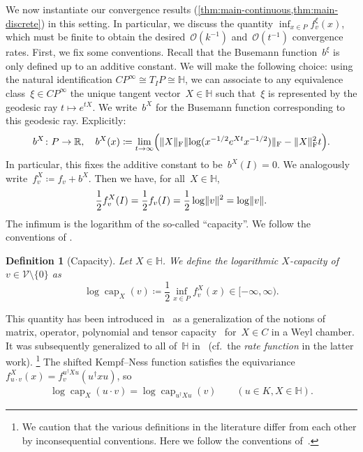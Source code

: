 \documentclass[11pt,letterpaper]{article}
\newtheorem{definition}[theorem]{Definition}\AddToHook{env/definition/begin}{\crefalias{theorem}{definition}}
\numberwithin{equation}{section}
\newcommand{\RR}{\mathbb{R}}
\newcommand{\bbH}{\mathbb{H}}
\newcommand{\VV}{\mathcal{V}}
\DeclareMathOperator{\capacity}{cap}
\DeclarePairedDelimiter\norm{\lVert}{\rVert}
\DeclarePairedDelimiter\parens{\lparen}{\rparen}
\begin{document}
We now instantiate our convergence results (\cref{thm:main-continuous,thm:main-discrete}) in this setting.
In particular, we discuss the quantity $\inf_{x \in P}f_v^\xi(x)$, which must be finite to obtain the desired~$\mathcal{O}(k^{-1})$ and~$\mathcal{O}(t^{-1})$ convergence rates.
First, we fix some conventions.
Recall that the Busemann function~$b^\xi$ is only defined up to an additive constant.
We will make the following choice: using the natural identification $CP^\infty \cong T_I P \cong \bbH$, we can associate to any equivalence class~$\xi\in CP^\infty$ the unique tangent vector~$X\in\bbH$ such that~$\xi$ is represented by the geodesic ray $t \mapsto e^{tX}$.
We write~$b^X$ for the Busemann function corresponding to this geodesic ray.
Explicitly:
\begin{align*}
    b^X \colon P \to \RR, \quad
    b^X(x) \coloneqq \lim_{t\to\infty} \parens*{ \norm{X}_{\mathrm F} \norm{\log(x^{-1/2}e^{Xt}x^{-1/2})}_{\mathrm F} - \norm{X}_{\mathrm F}^2 t }.
\end{align*}
In particular, this fixes the additive constant to be~$b^X(I)=0$.
We analogously write~$f_v^X \coloneqq f_v + b^X$.
Then we have, for all~$X \in \bbH$,
\[
  \frac12 f_v^X(I) = \frac12 f_v(I) = \frac12 \log \norm{v}^2 = \log \norm v.
\]
The infimum is the logarithm of the so-called ``capacity''.
We follow the conventions of \cite{FW2020}.

\begin{definition}[Capacity]
Let $X\in\bbH$.
We define the \emph{logarithmic $X$-capacity} of~$v\in\VV\setminus\{0\}$ as
\[
    \log\capacity_X(v) \coloneqq \frac12\inf_{x \in P}f_v^X(x) \in [-\infty,\infty).
\]
\end{definition}
\noindent
This quantity has been introduced in~\cite{BFGOWW2019} as a generalization of the notions of matrix, operator, polynomial and tensor capacity~\cite{gurvits1998deflation,gurvits2004classical,gurvits2006hyperbolic,BFGOWW2018} for~$X\in C$ in a Weyl chamber.
It was subsequently generalized to all of~$\bbH$ in~\cite{FW2020,botero2021large} (cf.\ the \emph{rate function} in the latter work).%
\footnote{We caution that the various definitions in the literature differ from each other by inconsequential conventions. Here we follow the conventions of~\cite{FW2020}.}
The shifted Kempf--Ness function satisfies the equivariance $f^X_{u \cdot v}(x) = f^{u^\dagger X u}_v(u^\dagger x u)$, so
\begin{align}\label{eq:log cap K equivariance}
    \log\capacity_X(u \cdot v)
= \log\capacity_{u^\dagger X u}(v)
\qquad (u \in K, X \in \bbH).
\end{align}
\end{document}
